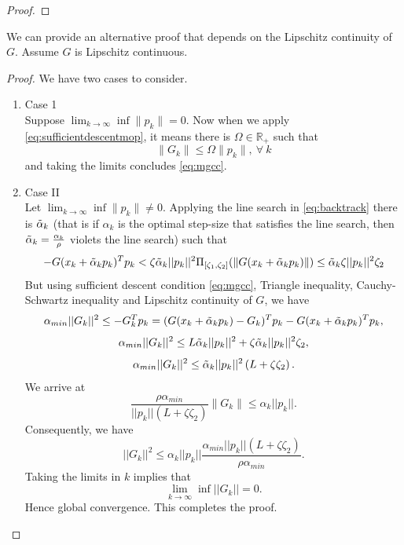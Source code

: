 \documentclass{article}
\newcommand{\R}{\mathbb{R}} %
\theoremstyle{remark}
\begin{document}
{\begin{proof}
\end{proof}
We can provide an alternative proof that depends on the Lipschitz continuity of $G$. Assume $G$ is Lipschitz continuous.
\begin{proof}
We have two cases to consider.
\begin{enumerate}
    \item Case 1\\
    Suppose $\lim_{k\rightarrow \infty}\inf\|p_k\|=0$. Now when we apply \eqref{eq:sufficientdescentmop}, it means there is $\Omega \in \R_+$ such that  
    \[
    \|G_k\|\leq \Omega\|p_k\|, ~\forall ~k
    \]
    and taking the limits concludes \eqref{eq:mgcc}.
    \item Case II\\
    Let $\lim_{k\rightarrow \infty}\inf\|p_k\|\neq 0$.  Applying the line search in \eqref{eq:backtrack} there is $\Tilde{\alpha}_k$ (that is if $\alpha_k$ is the optimal step-size that satisfies the line search, then $\Tilde{\alpha}_k=\frac{\alpha_k}{\rho}$ violets the line search) such that 
    \begin{equation}
    \label{eq:violetsmopcgm}
    -G(x_k+\Tilde{\alpha}_k p_k)^Tp_k< \zeta\Tilde{\alpha}_k||p_k||^2\Pi_{[\zeta_1, \zeta_2]}(\|G(x_k + \Tilde{\alpha}_k p_k)\|)\leq \Tilde{\alpha}_k\zeta||p_k||^2\zeta_2
    \end{equation}
    But using sufficient descent condition \eqref{eq:mgcc}, Triangle inequality, Cauchy-Schwartz inequality and Lipschitz continuity of $G$, we have
    \[
    \alpha_{min} ||G_k||^2 \leq -G_k^Tp_k=(G(x_k+\Tilde{\alpha}_kp_k)-G_k)^Tp_k-G(x_k+\Tilde{\alpha}_kp_k)^Tp_k,
    \]
     \[
    \alpha_{min} ||G_k||^2 \leq L\Tilde{\alpha}_k||p_k||^2+\zeta\Tilde{\alpha}_k||p_k||^2\zeta_2,
    \]
     \[
    \alpha_{min} ||G_k||^2 \leq \Tilde{\alpha}_k||p_k||^2\left(L+\zeta\zeta_2\right).\]
    We arrive at
    \[
    \frac{\rho\alpha_{min}}{||p_k||(L+\zeta\zeta_2 )}\|G_k\|\leq \alpha_k||p_k||.
    \]
    Consequently, we have
    \[
     ||G_k||^2\leq \alpha_k||p_k||\frac{\alpha_{min}||p_k||(L+\zeta\zeta_2) }{\rho\alpha_{min}}.
    \]
    Taking the limits in $k$ implies that 
    \[
    \lim_{k\rightarrow \infty}\inf ||G_k||=0.
    \]
    Hence global convergence. This completes the proof.
\end{enumerate} 
\end{proof}

}
\end{document}
